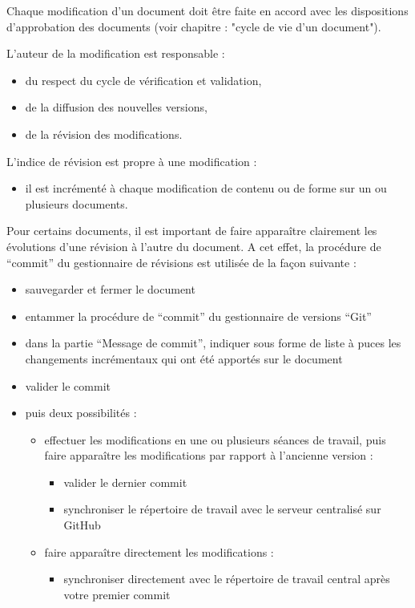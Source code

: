 \documentclass[a4paper]{article}
\begin{document}
Chaque modification d’un document doit être faite en accord avec les dispositions d’approbation des documents (voir chapitre : "cycle de vie d’un document"). 

L’auteur de la modification est responsable :

\begin{itemize}
\item du respect du cycle de vérification et validation,
\item de la diffusion des nouvelles versions,
\item de la révision des modifications.
\end{itemize}

L'indice de révision est propre à une modification :

\begin{itemize}
\item il est incrémenté à chaque modification de contenu ou de forme sur un ou plusieurs documents.
\end{itemize}

Pour certains documents, il est important de faire apparaître clairement les évolutions d'une révision à l'autre du document. A cet effet, la procédure de ``commit'' du gestionnaire de révisions est utilisée de la façon suivante :

\begin{itemize}
\item sauvegarder et fermer le document
\item entammer la procédure de ``commit'' du gestionnaire de versions ``Git''
\item dans la partie ``Message de commit'', indiquer sous forme de liste à puces les changements incrémentaux qui ont été apportés sur le document
\item valider le commit
\item puis deux possibilités :

\begin{itemize}
\item effectuer les modifications en une ou plusieurs séances de travail, puis faire apparaître les modifications par rapport à l'ancienne version :

\begin{itemize}
\item valider le dernier commit
\item synchroniser le répertoire de travail avec le serveur centralisé sur GitHub
\end{itemize}

\item faire apparaître directement les modifications :

\begin{itemize}
\item synchroniser directement avec le répertoire de travail central après votre premier commit
\end{itemize}

\end{itemize}
\end{itemize}
\end{document}
